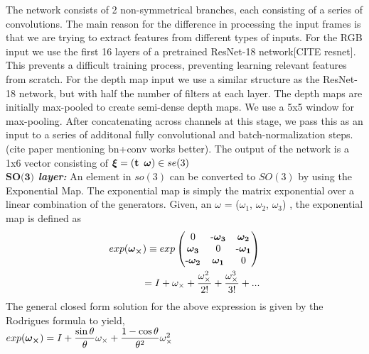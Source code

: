 \documentclass[letterpaper, 10 pt, conference]{ieeeconf}  %
\begin{document}
The network consists of 2 non-symmetrical branches, each consisting of a series of convolutions. The main reason for the difference in processing the input frames is that we are trying to extract features from different types of inputs. For the RGB input we use the first 16 layers of a pretrained ResNet-18 network[CITE resnet]. This prevents a difficult training process, preventing learning relevant features from scratch. For the depth map input we use a similar structure as the ResNet-18 network, but with half the number of filters at each layer. The depth maps are initially max-pooled to create semi-dense depth maps. We use a 5x5 window for max-pooling. After concatenating across channels at this stage, we pass this as an input to a series of additonal fully convolutional and batch-normalization steps. (cite paper mentioning bn+conv works better). The output of the network is a 1x6 vector consisting of $\mbox{\boldmath$\xi$} = (\textbf{t} \enspace\mbox{\boldmath$\omega$}) \in se(3)$\\

\textbf{\textit{$\textbf{SO(3)}$ layer:}} An element in $so(3)$ can be converted to $SO(3)$ by using the Exponential Map. The exponential map is simply the matrix exponential over a linear combination of the generators. Given, an
    \mbox{\boldmath$\omega$} = (\mbox{\boldmath$\omega_1$}, \mbox{\boldmath$\omega_2$}, \mbox{\boldmath$\omega_3$})
, the exponential map is defined as
\begin{equation}
\begin{split}
    exp(\mbox{\boldmath$\omega_\times$}) \equiv
    exp\left(
    \begin{matrix}
    0&\mbox{-\boldmath$\omega_3$}&\mbox{\boldmath$\omega_2$}\\ 
    \mbox{\boldmath$\omega_3$}&0&\mbox{-\boldmath$\omega_1$}\\ 
    \mbox{-\boldmath$\omega_2$}&\mbox{\boldmath$\omega_1$}&0
    \end{matrix}
    \right)\\
    = I + \omega_\times + \frac{\omega_\times^{2}}{2!} + \frac{\omega_\times^{3}}{3!} + ... 
\end{split}
\end{equation} 
The general closed form solution for the above expression is given by the Rodrigues formula to yield,\\

$exp(\mbox{\boldmath$\omega_\times$}) = I + \dfrac{\sin \theta}{\theta}\omega_\times + \dfrac{1 - \cos \theta}{\theta^{2}}\omega_\times^{2}$\\
\end{document}
